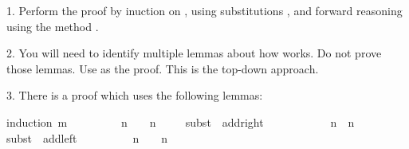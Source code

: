 \begin{isabellebody}
\begin{isamarkuptext}
 1. Perform the proof by inuction on , using substitutions , and forward reasoning using
   the method .

 2. You will need to identify multiple lemmas about how  works. Do not prove those lemmas. Use 
     as the proof. This is the top-down approach. 

 3. There is a proof which uses the following lemmas:

\end{isamarkuptext}\isamarkuptrue%
%
\isadelimproof
%
\endisadelimproof
%
\isatagproof
{}\isamarkupfalse%
{\isacharparenleft}{\kern0pt}induction\ m{\isacharparenright}{\kern0pt}\isanewline
\ \ \isamarkupfalse%
\ {}\isanewline
\ \ \isamarkupfalse%
\ {}{\isacharcolon}{\kern0pt}\ {\isachardoublequoteopen}n\ {\isacharplus}{\kern0pt}\ {}\ {\isacharequal}{\kern0pt}\ n{\isachardoublequoteclose}\isanewline
\ \ \ \ \isamarkupfalse%
{\isacharparenleft}{\kern0pt}subst\ {\isacharparenleft}{\kern0pt}{}{\isacharparenright}{\kern0pt}\ add{\isacharunderscore}{\kern0pt}{}{\isacharunderscore}{\kern0pt}right{\isacharparenright}{\kern0pt}\isanewline
\ \ \ \ \isacommand{{\isachardot}{\kern0pt}{\isachardot}{\kern0pt}}\isamarkupfalse%
\isanewline
\ \ \isamarkupfalse%
\ {}{\isacharcolon}{\kern0pt}\ {\isachardoublequoteopen}{}\ {\isacharplus}{\kern0pt}\ n\ {\isacharequal}{\kern0pt}\ n{\isachardoublequoteclose}\isanewline
\ \ \ \ \isamarkupfalse%
{\isacharparenleft}{\kern0pt}subst\ {\isacharparenleft}{\kern0pt}{}{\isacharparenright}{\kern0pt}\ add{\isacharunderscore}{\kern0pt}{}{\isacharunderscore}{\kern0pt}left{\isacharparenright}{\kern0pt}\isanewline
\ \ \ \ \isacommand{{\isachardot}{\kern0pt}{\isachardot}{\kern0pt}}\isamarkupfalse%
\isanewline
\isanewline
\ \ \isamarkupfalse%
\ {}{\isacharcolon}{\kern0pt}\ {\isachardoublequoteopen}n\ {\isacharplus}{\kern0pt}\ {}\ {\isacharequal}{\kern0pt}\ n{\isachardoublequoteclose}\isanewline
\ \ \ \ \isamarkupfalse%

\end{isabellebody}
